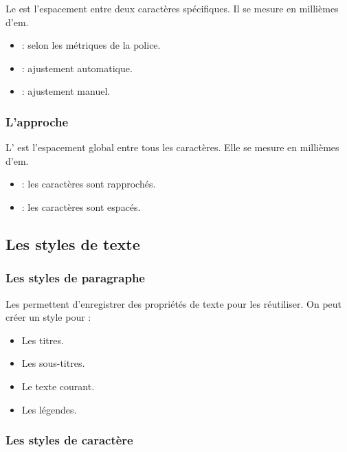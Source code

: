 Le  est l'espacement entre deux caractères spécifiques. Il se mesure en millièmes d'em.

\begin{itemize}
    \item {} : selon les métriques de la police.
    \item {} : ajustement automatique.
    \item {} : ajustement manuel.
\end{itemize}

\subsubsection{L'approche}

L' est l'espacement global entre tous les caractères. Elle se mesure en millièmes d'em.

\begin{itemize}
    \item {} : les caractères sont rapprochés.
    \item {} : les caractères sont espacés.
\end{itemize}

\subsection{Les styles de texte}

\subsubsection{Les styles de paragraphe}

Les  permettent d'enregistrer des propriétés de texte pour les réutiliser. On peut créer un style pour :

\begin{itemize}
    \item Les titres.
    \item Les sous-titres.
    \item Le texte courant.
    \item Les légendes.
\end{itemize}

\subsubsection{Les styles de caractère}

